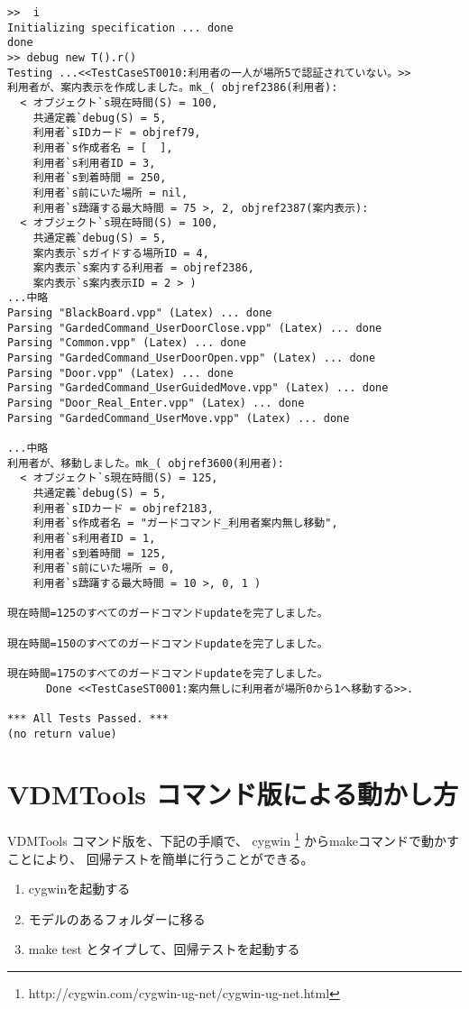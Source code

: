 \documentclass[a4paper,8pt]{jsarticle}
\begin{document}
\begin{verbatim}
>>  i
Initializing specification ... done
done
>> debug new T().r()
Testing ...<<TestCaseST0010:利用者の一人が場所5で認証されていない。>>
利用者が、案内表示を作成しました。mk_( objref2386(利用者):
  < オブジェクト`s現在時間(S) = 100,
    共通定義`debug(S) = 5,
    利用者`sIDカード = objref79,
    利用者`s作成者名 = [  ],
    利用者`s利用者ID = 3,
    利用者`s到着時間 = 250,
    利用者`s前にいた場所 = nil,
    利用者`s躊躇する最大時間 = 75 >, 2, objref2387(案内表示):
  < オブジェクト`s現在時間(S) = 100,
    共通定義`debug(S) = 5,
    案内表示`sガイドする場所ID = 4,
    案内表示`s案内する利用者 = objref2386,
    案内表示`s案内表示ID = 2 > )
...中略
Parsing "BlackBoard.vpp" (Latex) ... done
Parsing "GardedCommand_UserDoorClose.vpp" (Latex) ... done
Parsing "Common.vpp" (Latex) ... done
Parsing "GardedCommand_UserDoorOpen.vpp" (Latex) ... done
Parsing "Door.vpp" (Latex) ... done
Parsing "GardedCommand_UserGuidedMove.vpp" (Latex) ... done
Parsing "Door_Real_Enter.vpp" (Latex) ... done
Parsing "GardedCommand_UserMove.vpp" (Latex) ... done

...中略
利用者が、移動しました。mk_( objref3600(利用者):
  < オブジェクト`s現在時間(S) = 125,
    共通定義`debug(S) = 5,
    利用者`sIDカード = objref2183,
    利用者`s作成者名 = "ガードコマンド_利用者案内無し移動",
    利用者`s利用者ID = 1,
    利用者`s到着時間 = 125,
    利用者`s前にいた場所 = 0,
    利用者`s躊躇する最大時間 = 10 >, 0, 1 )

現在時間=125のすべてのガードコマンドupdateを完了しました。

現在時間=150のすべてのガードコマンドupdateを完了しました。

現在時間=175のすべてのガードコマンドupdateを完了しました。
      Done <<TestCaseST0001:案内無しに利用者が場所0から1へ移動する>>.
 
*** All Tests Passed. ***
(no return value)
\end{verbatim}

\section {VDMTools コマンド版による動かし方}
\label{runFromCygwin}
VDMTools コマンド版を、下記の手順で、
cygwin
\footnote{http://cygwin.com/cygwin-ug-net/cygwin-ug-net.html}
からmakeコマンドで動かすことにより、
回帰テストを簡単に行うことができる。

\begin{enumerate}
	\item cygwinを起動する
	\item モデルのあるフォルダーに移る
	\item make test とタイプして、回帰テストを起動する
\end{enumerate}
\end{document}
